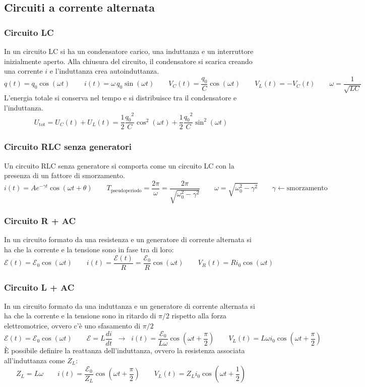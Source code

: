 \documentclass[a4paper]{article}
\begin{document}
\subsection{Circuiti a corrente alternata}
\subsubsection*{Circuito LC}
In un circuito LC si ha un condensatore carico, una induttanza e un interruttore inizialmente aperto. Alla chiusura del circuito,
il condensatore si scarica creando una corrente \(i\) e l'induttanza crea autoinduttanza.
\[q(t) = q_0 \cos (\omega t) \qquad i(t) = \omega \, q_0 \sin(\omega t) \qquad V_C(t) = \frac{q_0}{C} \cos(\omega t) \qquad V_L(t) =  -V_C(t) \qquad \omega = \frac{1}{\sqrt{LC}}\]
L'energia totale si conserva nel tempo e si distribuisce tra il condensatore e l'induttanza.
\[U_\text{tot} = U_C(t) + U_L(t) = \frac{1}{2} \frac{{q_0}^2}{C} \cos^2(\omega t) + \frac{1}{2} \frac{{q_0}^2}{C} \sin^2(\omega t)\]

\subsubsection*{Circuito RLC senza generatori}
Un circuito RLC senza generatore si comporta come un circuito LC con la presenza di un fattore di smorzamento.
\[i(t) = A e^{-\gamma t} \cos(\omega t + \theta) \qquad T_\text{pseudoperiodo} = \frac{2\pi}{\omega} = \frac{2\pi}{\sqrt{\omega_0^2 - \gamma^2}} \qquad \omega = \sqrt{\omega_0^2 - \gamma^2} \qquad \gamma \leftarrow \text{smorzamento}\]

\subsubsection*{Circuito R + AC}
In un circuito formato da una resistenza e un generatore di corrente alternata si ha che la corrente e la tensione sono in fase
tra di loro:
\[\mathcal{E}(t) = \mathcal{E}_0 \cos(\omega t) \qquad i(t) = \frac{\mathcal{E}(t)}{R} = \frac{\mathcal{E}_0}{R} \cos(\omega t) \qquad V_R(t) = R i_0 \cos(\omega t)\]

\subsubsection*{Circuito L + AC}
In un circuito formato da una induttanza e un generatore di corrente alternata si ha che la corrente e la tensione sono in ritardo
di \(\pi/2\) rispetto alla forza elettromotrice, ovvero c'è uno sfasamento di \(\pi/2\)
\[\mathcal{E}(t) = \mathcal{E}_0 \cos(\omega t) \qquad \mathcal{E} = L \frac{di}{dt} \;\;\rightarrow\;\; i(t) = \frac{\mathcal{E}_0}{L\omega} \cos \left( \omega t + \frac{\pi}{2} \right) \qquad V_L(t) = L \omega i_0 \cos \left( \omega t + \frac{\pi}{2} \right)\]
È possibile definire la reattanza dell'induttanza, ovvero la resistenza associata all'induttanza come \(Z_L\):
\[Z_L = L\omega \qquad i(t) = \frac{\mathcal{E}_0}{Z_L} \cos \left( \omega t + \frac{\pi}{2} \right) \qquad V_L(t) = Z_L i_0 \cos\left(\omega t + \frac{1}{2}\right)\]
\end{document}
